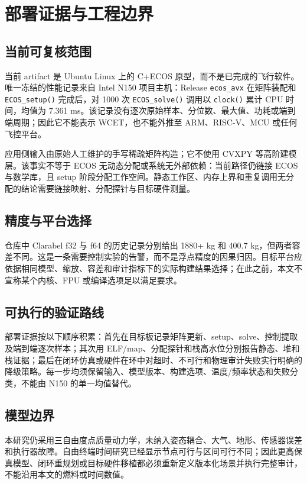 \section{部署证据与工程边界}

\subsection{当前可复核范围}

当前 artifact 是 Ubuntu Linux 上的 C+ECOS 原型，而不是已完成的飞行软件。唯一冻结的性能记录来自 Intel N150 项目主机：Release \texttt{ecos\_avx} 在矩阵装配和 \texttt{ECOS\_setup()} 完成后，对 1000 次 \texttt{ECOS\_solve()} 调用以 \texttt{clock()} 累计 CPU 时间，均值为 7.361 ms。该记录没有逐次原始样本、分位数、最大值、功耗或端到端周期；因此它不能表示 WCET，也不能外推至 ARM、RISC-V、MCU 或任何飞控平台。

应用侧输入由原始人工维护的手写稀疏矩阵构造；它不使用 CVXPY 等高阶建模层。该事实不等于 ECOS 无动态分配或系统无外部依赖：当前路径仍链接 ECOS 与数学库，且 setup 阶段分配工作空间。静态工作区、内存上界和重复调用无分配的结论需要链接映射、分配探针与目标硬件测量。

\subsection{精度与平台选择}

仓库中 Clarabel f32 与 f64 的历史记录分别给出 1880+ kg 和 400.7 kg，但两者容差不同。这是一条需要控制实验的告警，而不是浮点精度的因果归因。目标平台应依据相同模型、缩放、容差和审计指标下的实际构建结果选择；在此之前，本文不宣称某个内核、FPU 或编译选项足以满足要求。

\subsection{可执行的验证路线}

部署证据按以下顺序积累：首先在目标板记录矩阵更新、setup、solve、控制提取及端到端逐次样本；其次用 ELF/map、分配探针和栈高水位分别报告静态、堆和栈证据；最后在闭环仿真或硬件在环中对超时、不可行和物理审计失败实行明确的降级策略。每一步均须保留输入、模型版本、构建选项、温度/频率状态和失败分类，不能由 N150 的单一均值替代。

\subsection{模型边界}

本研究仍采用三自由度点质量动力学，未纳入姿态耦合、大气、地形、传感器误差和执行器故障。自由终端时间研究已经显示节点可行与区间可行不同；因此更高保真模型、闭环重规划或目标硬件移植都必须重新定义版本化场景并执行完整审计，不能沿用本文的燃料或时间数值。

